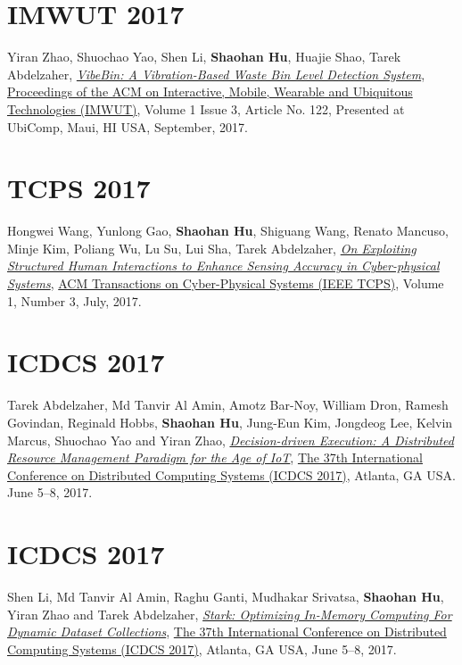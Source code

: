 \section{\sc IMWUT 2017}\hypertarget{zhao2017imwut}{}
Yiran Zhao, Shuochao Yao, Shen Li, \textbf{Shaohan Hu}, Huajie Shao, Tarek Abdelzaher,
\href{https://dl.acm.org/citation.cfm?id=3132027}{\emph{VibeBin: A Vibration-Based Waste Bin Level Detection System}},
\href{https://imwut.acm.org/}{\textsf{Proceedings of the ACM on Interactive, Mobile, Wearable and Ubiquitous Technologies (IMWUT)}},
Volume 1 Issue 3, Article No. 122, Presented at UbiComp, Maui, HI USA, September, 2017.

\section{\sc TCPS 2017}\hypertarget{wang2017tcps}{}
Hongwei Wang, Yunlong Gao, \textbf{Shaohan Hu}, Shiguang Wang, Renato Mancuso, Minje Kim, Poliang Wu, Lu Su, Lui Sha, Tarek Abdelzaher,
\href{http://dl.acm.org/citation.cfm?id=3064006}{\emph{On Exploiting Structured Human Interactions to Enhance Sensing Accuracy in Cyber-physical Systems}},
\href{http://tcps.acm.org/}{\textsf{ACM Transactions on Cyber-Physical Systems (IEEE TCPS)}},
Volume 1, Number 3, July, 2017.

\section{\sc ICDCS 2017}\hypertarget{abdelzaher2017icdcs}{}
Tarek Abdelzaher, Md Tanvir Al Amin, Amotz Bar-Noy, William Dron, Ramesh Govindan, Reginald Hobbs, \textbf{Shaohan Hu}, Jung-Eun Kim, Jongdeog Lee, Kelvin Marcus, Shuochao Yao and Yiran Zhao,
\href{http://ieeexplore.ieee.org/document/7980121}{\emph{Decision-driven Execution: A Distributed Resource Management Paradigm for the Age of IoT}},
\href{http://icdcs2017.gatech.edu/}{\textsf{The 37th International Conference on Distributed Computing Systems (ICDCS 2017)}},
Atlanta, GA USA. June 5--8, 2017.

\section{\sc ICDCS 2017}\hypertarget{li2017icdcs}{}
Shen Li, Md Tanvir Al Amin, Raghu Ganti, Mudhakar Srivatsa, \textbf{Shaohan Hu}, Yiran Zhao and Tarek Abdelzaher,
\href{http://ieeexplore.ieee.org/document/7979959}{\emph{Stark: Optimizing In-Memory Computing For Dynamic Dataset Collections}},
\href{http://icdcs2017.gatech.edu/}{\textsf{The 37th International Conference on Distributed Computing Systems (ICDCS 2017)}},
Atlanta, GA USA, June 5--8, 2017.

